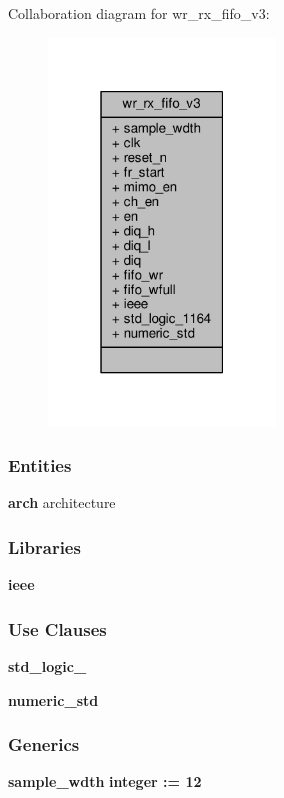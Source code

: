 Collaboration diagram for wr\+\_\+rx\+\_\+fifo\+\_\+v3\+:\nopagebreak
\begin{figure}[H]
\begin{center}
\leavevmode
\includegraphics[width=171pt]{de/d17/classwr__rx__fifo__v3__coll__graph}
\end{center}
\end{figure}
\subsubsection*{Entities}
\begin{DoxyCompactItemize}
\item 
{\bf arch} architecture
\end{DoxyCompactItemize}
\subsubsection*{Libraries}
 \begin{DoxyCompactItemize}
\item 
{\bf ieee} 
\end{DoxyCompactItemize}
\subsubsection*{Use Clauses}
 \begin{DoxyCompactItemize}
\item 
{\bf std\+\_\+logic\+\_}   
\item 
{\bf numeric\+\_\+std}   
\end{DoxyCompactItemize}
\subsubsection*{Generics}
 \begin{DoxyCompactItemize}
\item 
{\bf sample\+\_\+wdth} {\bfseries {\bfseries \textcolor{comment}{integer}\textcolor{vhdlchar}{ }\textcolor{vhdlchar}{ }\textcolor{vhdlchar}{\+:}\textcolor{vhdlchar}{=}\textcolor{vhdlchar}{ }\textcolor{vhdlchar}{ } \textcolor{vhdldigit}{12} \textcolor{vhdlchar}{ }}}
\end{DoxyCompactItemize}
